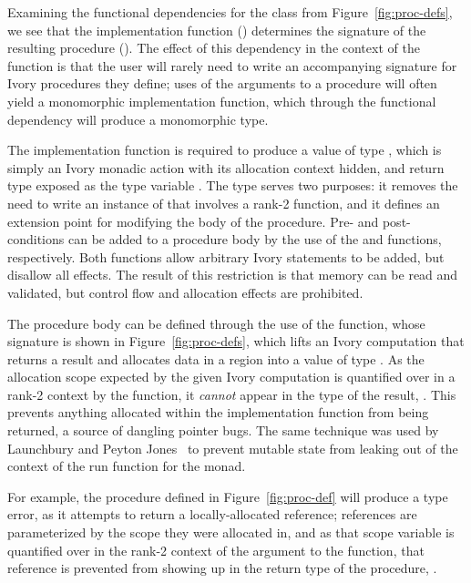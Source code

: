 Examining the functional dependencies for the  class from
Figure~\ref{fig:proc-defs}, we see that the implementation function ()
determines the signature of the resulting procedure ().  The effect of
this dependency in the context of the  function is that the user will
rarely need to write an accompanying  signature for Ivory procedures
they define; uses of the arguments to a procedure will often yield a monomorphic
implementation function, which through the functional dependency will produce a
monomorphic  type.

The implementation function is required to produce a value of type ,
which is simply an Ivory monadic action with its allocation context hidden, and
return type exposed as the type variable .  The  type serves two
purposes: it removes the need to write an instance of  that
involves a rank-2 function, and it defines an extension point for modifying the
body of the procedure.  Pre- and post-conditions can be added to a procedure body
by the use of the  and  functions, respectively.  Both
functions allow arbitrary Ivory statements to be added, but disallow all
effects.  The result of this restriction is that memory can be read and
validated, but control flow and allocation effects are prohibited.

The procedure body can be defined through the use of the  function,
whose signature is shown in Figure~\ref{fig:proc-defs}, which lifts an Ivory
computation that returns a result  and allocates data in a region 
into a value of type .  As the allocation scope expected by the given
Ivory computation is quantified over in a rank-2 context by the  function,
it \emph{cannot} appear in the type of the result, .  This
prevents anything allocated within the implementation function from
being returned, a source of dangling pointer bugs.  The same technique was
used by Launchbury and Peyton Jones~\cite{stmonad} to prevent mutable state
from leaking out of the context of the run function for the  monad.

For example, the procedure  defined in Figure~\ref{fig:proc-def} will
produce a type error, as it attempts to return a locally-allocated reference;
references are parameterized by the scope they were allocated in, and as that
scope variable is quantified over in the rank-2 context of the argument to the
 function, that reference is prevented from showing up in the return
type of the procedure, .

